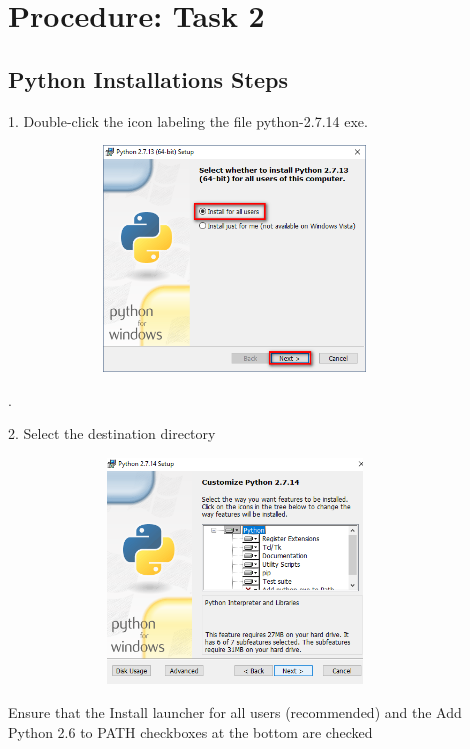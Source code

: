 \documentclass[11pt]{article}            %
\begin{document}
\section{Procedure: Task 2 }   
  
\subsection{Python Installations Steps }  

1. Double-click the icon labeling the file python-2.7.14 exe.\\


\begin{center}
  \includegraphics[width=12cm,height=6cm,keepaspectratio]{2.png}\\ 

\end{center} 
.


2. Select the destination directory\\ 


\begin{center}
  \includegraphics[width=12cm,height=6cm,keepaspectratio]{5.png}\\
\end{center}

Ensure that the Install launcher for all users (recommended) and the Add \\ Python 2.6 to PATH checkboxes at the bottom are checked
\end{document}
